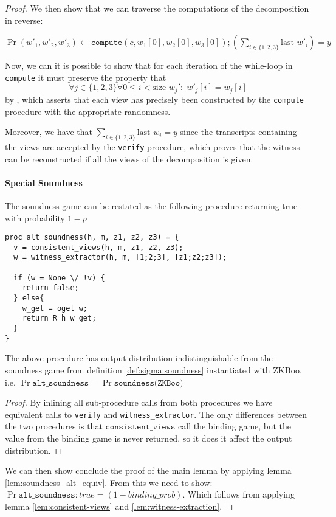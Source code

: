 \begin{proof}
  We then show that we can traverse the computations of the decomposition in
  reverse:
  \begin{lemma}
    \label{lem:witness-extraction}
      $\Pr{(w'_{1}, w'_{2}, w'_{3}) \leftarrow \texttt{compute}(c, w_{1}[0], w_{2}[0], w_{3}[0]); \left(\sum_{i \in \{1,2,3\}} \text{last }w'_{i} \right) = y}$
  \end{lemma}


  Now, we can it is possible to show that for each iteration of the while-loop
  in \texttt{compute} it must preserve the property that
  \[
    \forall j \in \{1,2,3\} \forall 0 \leq i < \text{size } w_{j}':\; w'_{j}[i] = w_{j}[i]
  \]
  by , which asserts that each view has precisely
  been constructed by the \texttt{compute} procedure with the appropriate randomness.

  Moreover, we have that $\sum_{i \in \{1,2,3\}} \text{last }w_{i} = y$ since
  the transcripts containing the views are accepted by the \texttt{verify}
  procedure, which proves that the witness can be reconstructed if all the views
  of the decomposition is given.


  \paragraph{Special Soundness}
  The soundness game can be restated as the following procedure returning true
  with probability $1-p$
\begin{lstlisting}
proc alt_soundness(h, m, z1, z2, z3) = {
  v = consistent_views(h, m, z1, z2, z3);
  w = witness_extractor(h, m, [1;2;3], [z1;z2;z3]);

  if (w = None \/ !v) {
    return false;
  } else{
    w_get = oget w;
    return R h w_get;
  }
}
\end{lstlisting}
  \begin{lemma}
    \label{lem:soundness_alt_equiv}
    The above procedure has output distribution indistinguishable from the
    soundness game from definition \ref{def:sigma:soundness} instantiated with
    ZKBoo, i.e.
    $\Pr{\texttt{alt\_soundness}} = \Pr{\texttt{soundness(ZKBoo)}}$
  \end{lemma}
  \begin{proof}
    By inlining all sub-procedure calls from both procedures we have equivalent
    calls to \texttt{verify} and \texttt{witness\_extractor}. The only
    differences between the two procedures is that
    $\texttt{consistent\_{views}}$ call the binding game, but the value from the
    binding game is never returned, so it does it affect the output distribution.
  \end{proof}

  We can then show conclude the proof of the main lemma by
  applying lemma \ref{lem:soundness_alt_equiv}.
  From this we need to show:
  $\Pr{\texttt{alt\_soundness} : true} = (1- binding\_{prob})$.
  Which follows from applying lemma \ref{lem:consistent-views} and \ref{lem:witness-extraction}.
\end{proof}

